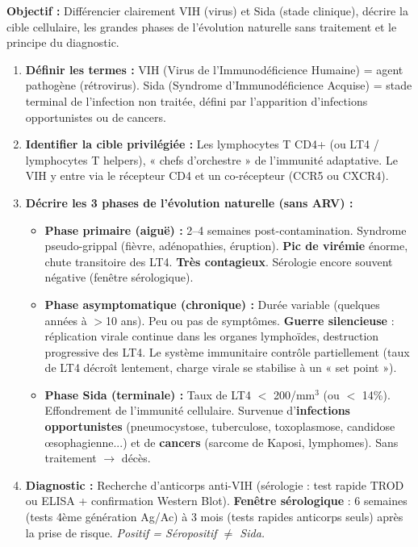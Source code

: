\documentclass[11pt]{article}
\newcommand{\cle}[1]{{\popxbold\color{popdark}#1}}
\begin{document}
\begin{methode}
\textbf{Objectif :} Différencier clairement \cle{VIH} (virus) et \cle{Sida} (stade clinique), décrire la cible cellulaire, les grandes phases de l'évolution naturelle sans traitement et le principe du diagnostic.
\begin{enumerate}
    \item \textbf{Définir les termes :} \cle{VIH} (Virus de l'Immunodéficience Humaine) = agent pathogène (rétrovirus). \cle{Sida} (Syndrome d'Immunodéficience Acquise) = stade terminal de l'infection non traitée, défini par l'apparition d'infections opportunistes ou de cancers.
    \item \textbf{Identifier la cible privilégiée :} Les \cle{lymphocytes T CD4+} (ou LT4 / lymphocytes T helpers), « chefs d'orchestre » de l'immunité adaptative. Le VIH y entre via le récepteur CD4 et un co-récepteur (CCR5 ou CXCR4).
    \item \textbf{Décrire les 3 phases de l'évolution naturelle (sans ARV) :}
    \begin{itemize}
        \item \textbf{Phase primaire (aiguë) :} 2--4 semaines post-contamination. Syndrome pseudo-grippal (fièvre, adénopathies, éruption). \textbf{Pic de virémie} énorme, chute transitoire des LT4. \textbf{Très contagieux}. Sérologie encore souvent négative (fenêtre sérologique).
        \item \textbf{Phase asymptomatique (chronique) :} Durée variable (quelques années à $>$10 ans). Peu ou pas de symptômes. \textbf{Guerre silencieuse} : réplication virale continue dans les organes lymphoïdes, destruction progressive des LT4. Le système immunitaire contrôle partiellement (taux de LT4 décroît lentement, charge virale se stabilise à un « set point »).
        \item \textbf{Phase Sida (terminale) :} Taux de LT4 $<$ 200/mm$^3$ (ou $<$ 14\%). Effondrement de l'immunité cellulaire. Survenue d'\textbf{infections opportunistes} (pneumocystose, tuberculose, toxoplasmose, candidose œsophagienne...) et de \textbf{cancers} (sarcome de Kaposi, lymphomes). Sans traitement $\rightarrow$ décès.
    \end{itemize}
    \item \textbf{Diagnostic :} Recherche d'anticorps anti-VIH (sérologie : test rapide TROD ou ELISA + confirmation Western Blot). \textbf{Fenêtre sérologique} : 6 semaines (tests 4ème génération Ag/Ac) à 3 mois (tests rapides anticorps seuls) après la prise de risque. \emph{Positif = Séropositif $\neq$ Sida.}
\end{enumerate}
\end{methode}
\end{document}
